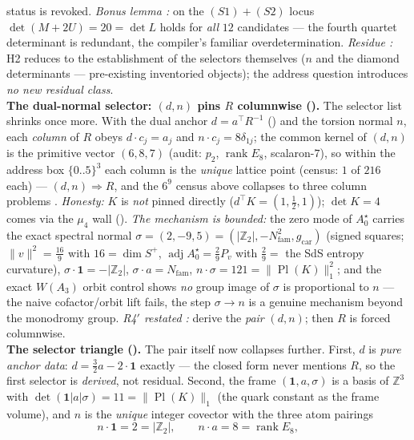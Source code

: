 \documentclass[11pt,a4paper]{article}
\newcommand{\Nfam}{N_{\mathrm{fam}}}
\newcommand{\gcar}{g_{\mathrm{car}}}
\newcommand{\Z}{\mathbb Z}
\begin{document}
\begin{keybox}
status is revoked. \emph{Bonus lemma \mE:} on the $(S1)+(S2)$ locus $\det(M+2U)=20=\det L$ holds for
\emph{all} $12$ candidates --- the fourth quartet determinant is redundant, the compiler's familiar
overdetermination. \emph{Residue \mC:} H2 reduces to the establishment of the selectors themselves
($n$ and the diamond determinants --- pre-existing inventoried objects); the address question
introduces \emph{no new residual class}.
\smallskip\\
\noindent\textbf{The dual-normal selector: $(d,n)$ pins $R$ columnwise ().}
The selector list shrinks once more. With the dual anchor $d=a^\top R^{-1}$ ()
and the torsion normal $n$, each \emph{column} of $R$ obeys $d\cdot c_j=a_j$ and $n\cdot c_j=8\delta_{1j}$;
the common kernel of $(d,n)$ is the primitive vector $(6,8,7)$ (audit: $p_2$, $\operatorname{rank}E_8$,
scalaron-$7$), so within the address box $\{0..5\}^3$ each column is the \emph{unique} lattice point
(census: $1$ of $216$ each) --- $(d,n)\Rightarrow R$, and the $6^9$ census above collapses to three
column problems \mE. \emph{Honesty:} $K$ is \emph{not} pinned directly ($d^\top K=(1,\tfrac12,1)$); $\det
K=4$ comes via the $\mu_4$ wall (). \emph{The mechanism is bounded:} the zero
mode of $A_0^\star$ carries the exact spectral normal $\sigma=(2,-9,5)=(|\Z_2|,-\Nfam^2,\gcar)$ (signed
squares; $\|v\|^2=\tfrac{16}9$ with $16=\dim S^+$, $\operatorname{adj}A_0^\star=\tfrac29P_v$ with
$\tfrac29=$ the SdS entropy curvature), $\sigma\cdot\mathbf 1=-|\Z_2|$, $\sigma\cdot a=\Nfam$,
$n\cdot\sigma=121=\|\operatorname{Pl}(K)\|_1^2$; and the exact $W(A_3)$ orbit control shows \emph{no}
group image of $\sigma$ is proportional to $n$ --- the naive cofactor/orbit lift fails, the step
$\sigma\to n$ is a genuine mechanism beyond the monodromy group. \emph{R4$'$ restated \mC:} derive the
\emph{pair} $(d,n)$; then $R$ is forced columnwise.
\smallskip\\
\noindent\textbf{The selector triangle ().} The pair itself now
collapses further. First, $d$ is \emph{pure anchor data}: $d=\tfrac32a-2\cdot\mathbf1$ exactly --- the
closed form never mentions $R$, so the first selector is \emph{derived}, not residual. Second, the frame
$(\mathbf1,a,\sigma)$ is a basis of $\Z^3$ with $\det(\mathbf1|a|\sigma)=11=\|\operatorname{Pl}(K)\|_1$
(the quark constant as the frame volume), and $n$ is the \emph{unique} integer covector with the three
atom pairings
\[
  \boxed{\ n\cdot\mathbf1=2=|\Z_2|,\qquad n\cdot a=8=\operatorname{rank}E_8,\qquad
}\]
\end{keybox}
\end{document}

